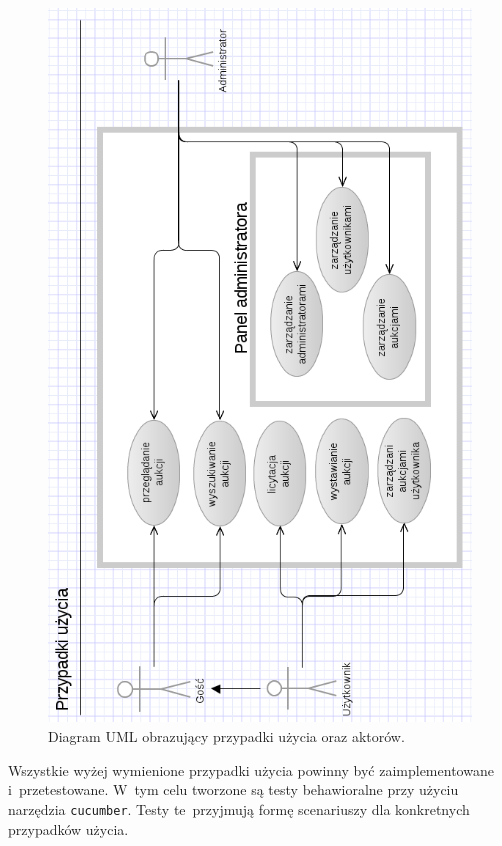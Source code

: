 \begin{figure}[hbt]
  \begin{center}
    \includegraphics[height=0.8\textheight]{obrazki/usecase.png}
  \end{center}
  \caption{Diagram UML obrazujący przypadki użycia oraz aktorów.}
  \label{usecase}
\end{figure}

Wszystkie wyżej wymienione przypadki użycia powinny być zaimplementowane i~przetestowane. W~tym celu tworzone są testy behawioralne przy użyciu narzędzia \texttt{cucumber}. Testy te~przyjmują formę scenariuszy dla konkretnych przypadków użycia.

